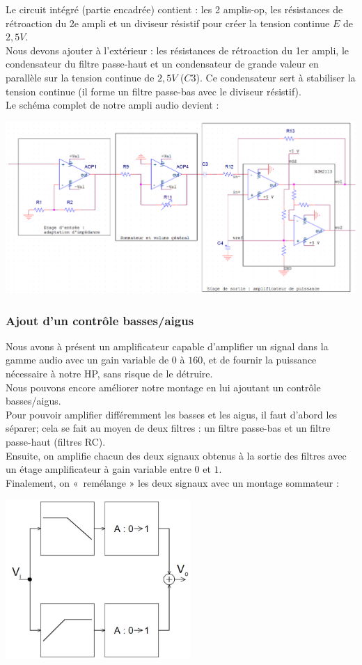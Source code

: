 Le circuit intégré (partie encadrée) contient : les 2 amplis-op, les résistances de rétroaction du 2e ampli et un diviseur résistif pour créer la tension continue $E$ de $2,5V$.\\
Nous devons ajouter à l'extérieur : les résistances de rétroaction du 1er ampli, le condensateur du filtre passe-haut et un condensateur de grande valeur en parallèle sur la tension continue de $2,5V$ ($C3$). Ce condensateur sert à stabiliser la tension continue (il forme un filtre passe-bas avec le diviseur résistif).\\
Le schéma complet de notre ampli audio devient :
\begin{center}
\includegraphics[width=16cm]{figures/montage_complet_sans_bassesaigus.png}
\end{center}

\subsubsection{Ajout d'un contrôle basses/aigus}
Nous avons à présent un amplificateur capable d'amplifier un signal dans la gamme audio avec un gain variable de $0$ à $160$, et de fournir la puissance nécessaire à notre HP, sans risque de le détruire.\\
Nous pouvons encore améliorer notre montage en lui ajoutant un contrôle basses/aigus.\\
Pour pouvoir amplifier différemment les basses et les aigus, il faut d'abord les séparer; cela se fait au moyen de deux filtres : un filtre passe-bas et un filtre passe-haut (filtres RC).\\
Ensuite, on amplifie chacun des deux signaux obtenus à la sortie des filtres avec un étage amplificateur à gain variable entre $0$ et $1$.\\
Finalement, on « remélange » les deux signaux avec un montage sommateur :
\begin{center}
\includegraphics[width=7cm]{figures/AOPsommateur}
\end{center}

